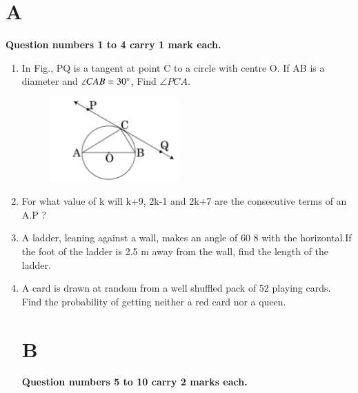 \documentclass[journal,12pt,twocolumn]{IEEEtran}
\begin{document}
\section{\textbf{A}}
\textbf{Question numbers 1 to 4 carry 1 mark each.}
\begin{enumerate}
\item In Fig., PQ is a tangent at point C to a circle with centre O. If AB is a diameter and $\angle CAB = 30\degree $, Find $\angle PCA$.\\

\begin{figure}[H]
\centering
	\includegraphics[width=5cm]{1.png}
\label{fig:my_label}
\end{figure} 

\item For what value of k will k+9, 2k-1 and 2k+7 are the consecutive terms of an A.P ?\\

\item A ladder, leaning against a wall, makes an angle of 60 8 with the horizontal.If the foot of the ladder is 2.5 m away from the wall, find the length of the ladder.\\

\item A card is drawn at random from a well shuffled pack of 52 playing cards. Find the probability of getting neither a red card nor a queen.\\

\section{\textbf{B}}
\textbf{Question numbers 5 to 10 carry 2 marks each.}\\


\end{enumerate}
\end{document}
